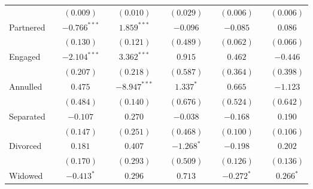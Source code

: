 \begin{tabular}{l c c c c c c c c c c}
                   &                & $(0.009)$      &                & $(0.010)$      &                & $(0.029)$      &                & $(0.006)$      &                & $(0.006)$      \\
Partnered          &                & $-0.766^{***}$ &                & $1.859^{***}$  &                & $-0.096$       &                & $-0.085$       &                & $0.086$        \\
                   &                & $(0.130)$      &                & $(0.121)$      &                & $(0.489)$      &                & $(0.062)$      &                & $(0.066)$      \\
Engaged            &                & $-2.104^{***}$ &                & $3.362^{***}$  &                & $0.915$        &                & $0.462$        &                & $-0.446$       \\
                   &                & $(0.207)$      &                & $(0.218)$      &                & $(0.587)$      &                & $(0.364)$      &                & $(0.398)$      \\
Annulled           &                & $0.475$        &                & $-8.947^{***}$ &                & $1.337^{*}$    &                & $0.665$        &                & $-1.123$       \\
                   &                & $(0.484)$      &                & $(0.140)$      &                & $(0.676)$      &                & $(0.524)$      &                & $(0.642)$      \\
Separated          &                & $-0.107$       &                & $0.270$        &                & $-0.038$       &                & $-0.168$       &                & $0.190$        \\
                   &                & $(0.147)$      &                & $(0.251)$      &                & $(0.468)$      &                & $(0.100)$      &                & $(0.106)$      \\
Divorced           &                & $0.181$        &                & $0.407$        &                & $-1.268^{*}$   &                & $-0.198$       &                & $0.202$        \\
                   &                & $(0.170)$      &                & $(0.293)$      &                & $(0.509)$      &                & $(0.126)$      &                & $(0.136)$      \\
Widowed            &                & $-0.413^{*}$   &                & $0.296$        &                & $0.713$        &                & $-0.272^{*}$   &                & $0.266^{*}$    \\

\end{tabular}
